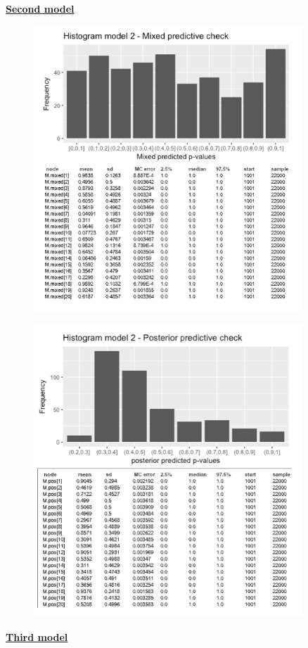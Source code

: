 \documentclass{article}
\begin{document}
\newpage
\underline{\textbf{Second model}}
\begin{figure}[ht!]
\centering
\includegraphics[width=10.1cm]{figures/model2_posmixpred.png}
\end{figure}

\begin{figure}[ht!]
\centering
\includegraphics[width=10.1cm]{figures/model2_pospred.png}
\end{figure}

\newpage
\underline{\textbf{Third model}}
\end{document}
